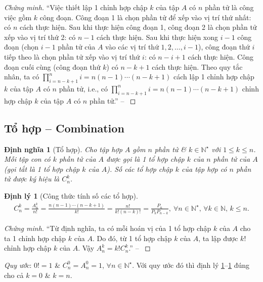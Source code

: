\documentclass[oneside]{book}
\numberwithin{equation}{section}
\newtheorem{dinhnghia}{Định nghĩa}[section]
\newtheorem{dinhly}{Định lý}[section]
\begin{document}
\begin{proof}[Chứng minh]
	``Việc thiết lập 1 chỉnh hợp chập $k$ của tập $A$ có $n$ phần tử là công việc gồm $k$ công đoạn. Công đoạn 1 là chọn phần tử để xếp vào vị trí thứ nhất: có $n$ cách thực hiện. Sau khi thực hiện công đoạn 1, công đoạn 2 là chọn phần tử xếp vào vị trí thứ 2: có $n - 1$ cách thực hiện. Sau khi thực hiện xong $i - 1$ công đoạn (chọn $i - 1$ phần tử của $A$ vào các vị trí thứ $1,2,\ldots,i - 1$), công đoạn thứ $i$ tiếp theo là chọn phần tử xếp vào vị trí thứ $i$: có $n - i + 1$ cách thực hiện. Công đoạn cuối cùng (công đoạn thứ $k$) có $n - k + 1$ cách thực hiện. Theo quy tắc nhân, ta có $\prod_{i = n - k + 1}^n i = n(n - 1)\cdots(n - k + 1)$ cách lập 1 chỉnh hợp chập $k$ của tập $A$ có $n$ phần tử, i.e., có $\prod_{i = n - k + 1}^n i = n(n - 1)\cdots(n - k + 1)$ chỉnh hợp chập $k$ của tập $A$ có $n$ phần tử.'' -- \cite[p. 86]{TL_chuyen_Toan_Dai_So_Giai_Tich_11}
\end{proof}

\subsection{Tổ hợp -- Combination}

\begin{dinhnghia}[Tổ hợp]
	Cho tập hợp $A$ gồm $n$ phần tử \& $k\in\mathbb{N}^\star$ với $1\le k\le n$. Mỗi tập con có $k$ phần tử của $A$ được gọi là 1 \emph{tổ hợp chập $k$ của $n$ phần tử của $A$} (gọi tắt là 1 \emph{tổ hợp chập $k$} của $A$). Số các tổ hợp chập $k$ của tập hợp có $n$ phần tử được ký hiệu là $C_n^k$.
\end{dinhnghia}

\begin{dinhly}[Công thức tính số các tổ hợp]
	\label{thm:to hop}
	\begin{align*}
		C_n^k = \frac{A_n^k}{n!} = \frac{n(n - 1)\cdots(n - k + 1)}{k!} = \frac{n!}{k!(n - k)!} = \frac{P_n}{P_kP_{n-k}},\ \forall n\in\mathbb{N}^\star,\,\forall k\in\mathbb{N},\,k\le n.
	\end{align*}
\end{dinhly}

\begin{proof}[Chứng minh]
	``Từ định nghĩa, ta có mỗi hoán vị của 1 tổ hợp chập $k$ của $A$ cho ta 1 chỉnh hợp chập $k$ của $A$. Do đó, từ 1 tổ hợp chập $k$ của $A$, ta lập được $k!$ chỉnh hợp chập $k$ của $A$. Vậy $A_n^k = k!C_n^k$.'' -- \cite[p. 86]{TL_chuyen_Toan_Dai_So_Giai_Tich_11}
\end{proof}
\textit{Quy ước}: $0! = 1$ \& $C_n^0 = A_n^0 = 1$, $\forall n\in\mathbb{N}^\star$. Với quy ước đó thì định lý \ref{thm:to hop}--\ref{thm:to hop} đúng cho cả $k = 0$ \& $k = n$.
\end{document}

